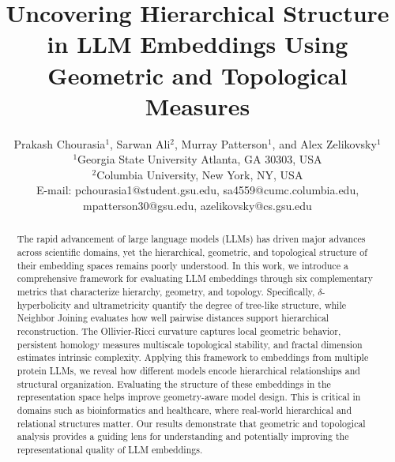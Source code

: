 \documentclass[]{Liebert_Author_revised}
\title{
Uncovering Hierarchical Structure in LLM Embeddings Using Geometric and Topological Measures
}
\author{Prakash Chourasia$^1$, Sarwan Ali$^2$, Murray Patterson$^1$, and Alex Zelikovsky$^1$\\
  {$^1$Georgia State University} 
  {Atlanta, GA 30303, USA}\\
  {$^2$Columbia University, New York, NY, USA}\\
E-mail: pchourasia1@student.gsu.edu, sa4559@cumc.columbia.edu, \\
   mpatterson30@gsu.edu, azelikovsky@cs.gsu.edu \\ 
}
\date{}
\begin{document}
 

\maketitle 


\begin{abstract}
The rapid advancement of large language models (LLMs) has driven major advances across scientific domains, yet the hierarchical, geometric, and topological structure of their embedding spaces remains poorly understood. In this work, we introduce a comprehensive framework for evaluating LLM embeddings through six complementary metrics that characterize hierarchy, geometry, and topology. Specifically, $\delta$-hyperbolicity and ultrametricity quantify the degree of tree-like structure, while Neighbor Joining evaluates how well pairwise distances support hierarchical reconstruction. The Ollivier-Ricci curvature captures local geometric behavior, persistent homology measures multiscale topological stability, and fractal dimension estimates intrinsic complexity. Applying this framework to embeddings from multiple protein LLMs, we reveal how different models encode hierarchical relationships and structural organization. Evaluating the structure of these embeddings in the representation space helps improve geometry-aware model design. This is critical in domains such as bioinformatics and healthcare, where real-world hierarchical and relational structures matter. Our results demonstrate that geometric and topological analysis provides a guiding lens for understanding and potentially improving the representational quality of LLM embeddings.
\end{abstract}
\end{document}
